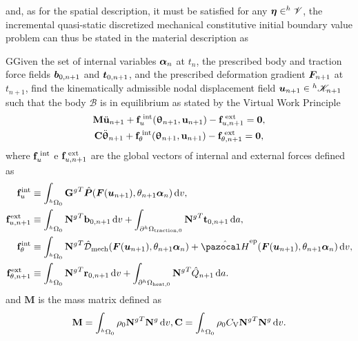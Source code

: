 and, as for the spatial description, it must  be satisfied for any $\bm{\eta} \in ^h \mathscr{V}$, the incremental quasi-static discretized mechanical constitutive initial boundary value problem can thus be stated in the material description as
\begin{problem}
GGiven the set of internal variables $\bm{\alpha}_n$ at $t_n$, the prescribed body and traction force fields $\bm{b}_{0,n+1}$ and $\bm{t}_{0,n+1}$, and the prescribed deformation gradient $\bm{F}_{n+1}$ at $t_{n+1}$, find the kinematically admissible nodal displacement field $\bm{u}_{n+1}\in {^h\mathscr{K}_{n+1}}$ such that the body $\mathscr{B}$ is in equilibrium as stated by the Virtual Work Principle
\begin{gather}
    \mathbf M \ddot{\mathbf u}_{n+1} +\mathbf f_u^\text{\;int}(\bm \uptheta_{n+1}, \mathbf u_{n+1})-\mathbf f^\text{\;ext}_{u,n+1}=\mathbf 0, \\
    \mathbf C \ddot{\bm \uptheta}_{n+1} +\mathbf f_\theta^\text{\;int}(\bm \uptheta_{n+1}, \mathbf u_{n+1})-\mathbf f^\text{\;ext}_{\theta,n+1}=\mathbf 0,
\end{gather}
where $\mathbf f_u^\text{\;int}$ e $\mathbf f^\text{\;ext}_{u,n+1}$ are the global vectors of internal and external forces defined as
\begin{align}
    \mathbf f_u^\text{int} &\equiv \int_{^h\Omega_0}{\mathbf G^g}^T \hat{\mat P}(\mat F(\bm u_{n+1}), \theta_{n+1} \vect \alpha_n)\ud v,\\
    \mathbf f^\text{ext}_{u,n+1} &\equiv \int_{^h\Omega_0}{\mathbf N^g}^T \mathbf b_{0,n+1}\ud v + \int_{\partial^h\Omega_\text{traction,0}}{\mathbf N^g}^T \mathbf t_{0,n+1}\ud a,\\
    \mathbf f_\theta^\text{int} &\equiv \int_{^h\Omega_0}{\mathbf N^g}^T \hat{\mathcal D}_\text{mech}(\mat F(\bm u_{n+1}), \theta_{n+1} \vect \alpha_n) +\hat{\pazocal H}^\text{ep}(\mat F(\bm u_{n+1}), \theta_{n+1} \vect \alpha_n) \ud v,\\
    \mathbf f^\text{ext}_{\theta,n+1} &\equiv \int_{^h\Omega_0}{\mathbf N^g}^T \mathbf r_{0,n+1}\ud v + \int_{\partial^h\Omega_\text{heat,0}}{\mathbf N^g}^T \hat Q_{n+1}\ud a.
\end{align}
and $\mathbf M$ is the mass matrix defined as
\begin{equation}
  \mathbf M = \int_{{}^h\Omega_0} \rho_0 {\mathbf{N}^g}^T\mathbf{N}^g \,\mathrm{d} v,\\
  \mathbf C = \int_{{}^h\Omega_0} \rho_0C_\mathrm{V} {\mathbf{N}^g}^T\mathbf{N}^g \,\mathrm{d} v.
\end{equation}
\end{problem}

